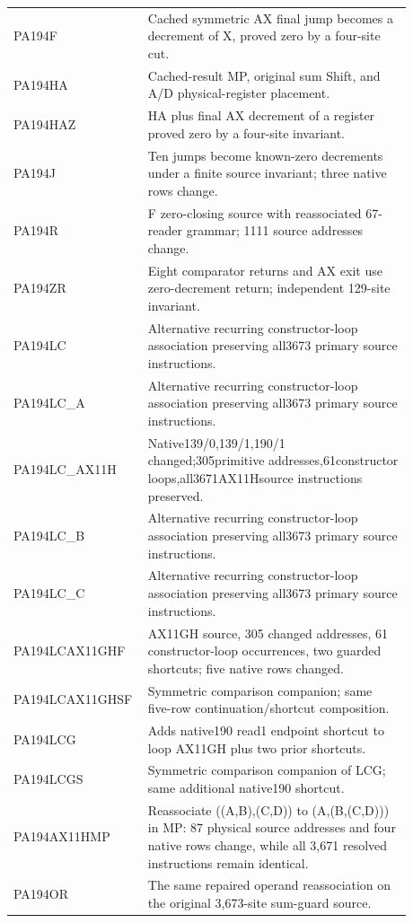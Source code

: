 \begin{longtable}{p{0.24\linewidth}p{0.64\linewidth}}
PA194F & Cached symmetric AX final jump becomes a decrement of X, proved zero by a four-site cut.\\[4pt]
PA194HA & Cached-result MP, original sum Shift, and A/D physical-register placement.\\[4pt]
PA194HAZ & HA plus final AX decrement of a register proved zero by a four-site invariant.\\[4pt]
PA194J & Ten jumps become known-zero decrements under a finite source invariant; three native rows change.\\[4pt]
PA194R & F zero-closing source with reassociated 67-reader grammar; 1111 source addresses change.\\[4pt]
PA194ZR & Eight comparator returns and AX exit use zero-decrement return; independent 129-site invariant.\\[4pt]
PA194LC & Alternative recurring constructor-loop association preserving all3673 primary source instructions.\\[4pt]
PA194LC\_A & Alternative recurring constructor-loop association preserving all3673 primary source instructions.\\[4pt]
PA194LC\_AX11H & Native139/0,139/1,190/1 changed;305primitive addresses,61constructor loops,all3671AX11Hsource instructions preserved.\\[4pt]
PA194LC\_B & Alternative recurring constructor-loop association preserving all3673 primary source instructions.\\[4pt]
PA194LC\_C & Alternative recurring constructor-loop association preserving all3673 primary source instructions.\\[4pt]
PA194LCAX11GHF & AX11GH source, 305 changed addresses, 61 constructor-loop occurrences, two guarded shortcuts; five native rows changed.\\[4pt]
PA194LCAX11GHSF & Symmetric comparison companion; same five-row continuation/shortcut composition.\\[4pt]
PA194LCG & Adds native190 read1 endpoint shortcut to loop AX11GH plus two prior shortcuts.\\[4pt]
PA194LCGS & Symmetric comparison companion of LCG; same additional native190 shortcut.\\[4pt]
PA194AX11HMP & Reassociate ((A,B),(C,D)) to (A,(B,(C,D))) in MP: 87 physical source addresses and four native rows change, while all 3,671 resolved instructions remain identical.\\[4pt]
PA194OR & The same repaired operand reassociation on the original 3,673-site sum-guard source.\\[4pt]

\end{longtable}
